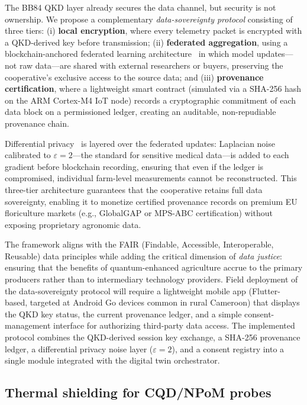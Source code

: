 \documentclass[11pt,a4paper]{article}
\begin{document}
The BB84 QKD layer already secures the data channel, but security is not ownership. We propose a complementary \textit{data-sovereignty protocol} consisting of three tiers: (i) \textbf{local encryption}, where every telemetry packet is encrypted with a QKD-derived key before transmission; (ii) \textbf{federated aggregation}, using a blockchain-anchored federated learning architecture~\cite{AgriFLChain2025} in which model updates---not raw data---are shared with external researchers or buyers, preserving the cooperative's exclusive access to the source data; and (iii) \textbf{provenance certification}, where a lightweight smart contract (simulated via a SHA-256 hash on the ARM Cortex-M4 IoT node) records a cryptographic commitment of each data block on a permissioned ledger, creating an auditable, non-repudiable provenance chain.

Differential privacy~\cite{Zafar2025} is layered over the federated updates: Laplacian noise calibrated to $\varepsilon = 2$---the standard for sensitive medical data---is added to each gradient before blockchain recording, ensuring that even if the ledger is compromised, individual farm-level measurements cannot be reconstructed. This three-tier architecture guarantees that the cooperative retains full data sovereignty, enabling it to monetize certified provenance records on premium EU floriculture markets (e.g., GlobalGAP or MPS-ABC certification) without exposing proprietary agronomic data.

The framework aligns with the FAIR (Findable, Accessible, Interoperable, Reusable) data principles while adding the critical dimension of \textit{data justice}: ensuring that the benefits of quantum-enhanced agriculture accrue to the primary producers rather than to intermediary technology providers. Field deployment of the data-sovereignty protocol will require a lightweight mobile app (Flutter-based, targeted at Android Go devices common in rural Cameroon) that displays the QKD key status, the current provenance ledger, and a simple consent-management interface for authorizing third-party data access. The implemented protocol combines the QKD-derived session key exchange, a SHA-256 provenance ledger, a differential privacy noise layer ($\varepsilon = 2$), and a consent registry into a single module integrated with the digital twin orchestrator.

\subsection{Thermal shielding for CQD/NPoM probes}
\label{SI-sec:thermal_shielding}
\end{document}
